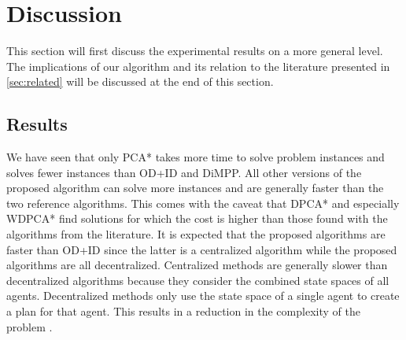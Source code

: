 \section{Discussion}\label{sec:discussion}
This section will first discuss the experimental results on a more general 
level. The implications of 
our algorithm and its relation to the literature presented in 
\autoref{sec:related} will be discussed at the end of this section.


\subsection{Results}

We have seen that only PCA* takes more time to solve problem instances and
solves fewer instances than OD+ID and DiMPP. All other versions of the proposed
algorithm can solve more
instances and are generally faster than the two reference algorithms. This
comes with the caveat that DPCA* and especially WDPCA* find solutions for which 
the cost is higher than those found with the algorithms from the literature. It 
is expected that the proposed algorithms are faster than OD+ID
since the latter is a centralized algorithm while the proposed algorithms are
all decentralized. Centralized methods are generally slower than decentralized
algorithms because they consider the combined state spaces
of all agents. Decentralized methods only use the state space of a single agent
to create a plan for that agent. This results in a reduction in the complexity
of the problem \cite{bennewitz2002,sharon2013}.

